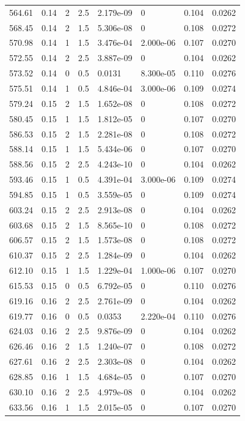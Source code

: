 \documentclass[preview]{standalone}
\begin{document}
{{{{\begin{tabular}{L{1.2cm}C{1.2cm} C{0.3cm}C{0.5cm} C{1.4cm}C{1.4cm} C{1.4cm}C{1.4cm}}
  564.61  &  0.14  & 2     & 2.5 &  2.179e-09  & 0  & 0.104 &  0.0262   \\ 
  568.45  &  0.14  & 2     & 1.5 &  5.306e-08  & 0  & 0.108 &  0.0272   \\ 
  570.98  &  0.14  & 1     & 1.5 &  3.476e-04  & 2.000e-06  & 0.107 &  0.0270   \\ 
  572.55  &  0.14  & 2     & 2.5 &  3.887e-09  & 0  & 0.104 &  0.0262   \\ 
  573.52  &  0.14  & 0     & 0.5 &  0.0131  & 8.300e-05  & 0.110 &  0.0276   \\ 
  575.51  &  0.14  & 1     & 0.5 &  4.846e-04  & 3.000e-06  & 0.109 &  0.0274   \\ 
  579.24  &  0.15  & 2     & 1.5 &  1.652e-08  & 0  & 0.108 &  0.0272   \\ 
  580.45  &  0.15  & 1     & 1.5 &  1.812e-05  & 0  & 0.107 &  0.0270   \\ 
  586.53  &  0.15  & 2     & 1.5 &  2.281e-08  & 0  & 0.108 &  0.0272   \\ 
  588.14  &  0.15  & 1     & 1.5 &  5.434e-06  & 0  & 0.107 &  0.0270   \\ 
  588.56  &  0.15  & 2     & 2.5 &  4.243e-10  & 0  & 0.104 &  0.0262   \\ 
  593.46  &  0.15  & 1     & 0.5 &  4.391e-04  & 3.000e-06  & 0.109 &  0.0274   \\ 
  594.85  &  0.15  & 1     & 0.5 &  3.559e-05  & 0  & 0.109 &  0.0274   \\ 
  603.24  &  0.15  & 2     & 2.5 &  2.913e-08  & 0  & 0.104 &  0.0262   \\ 
  603.68  &  0.15  & 2     & 1.5 &  8.565e-10  & 0  & 0.108 &  0.0272   \\ 
  606.57  &  0.15  & 2     & 1.5 &  1.573e-08  & 0  & 0.108 &  0.0272   \\ 
  610.37  &  0.15  & 2     & 2.5 &  1.284e-09  & 0  & 0.104 &  0.0262   \\ 
  612.10  &  0.15  & 1     & 1.5 &  1.229e-04  & 1.000e-06  & 0.107 &  0.0270   \\ 
  615.53  &  0.15  & 0     & 0.5 &  6.792e-05  & 0  & 0.110 &  0.0276   \\ 
  619.16  &  0.16  & 2     & 2.5 &  2.761e-09  & 0  & 0.104 &  0.0262   \\ 
  619.77  &  0.16  & 0     & 0.5 &  0.0353  & 2.220e-04  & 0.110 &  0.0276   \\ 
  624.03  &  0.16  & 2     & 2.5 &  9.876e-09  & 0  & 0.104 &  0.0262   \\ 
  626.46  &  0.16  & 2     & 1.5 &  1.240e-07  & 0  & 0.108 &  0.0272   \\ 
  627.61  &  0.16  & 2     & 2.5 &  2.303e-08  & 0  & 0.104 &  0.0262   \\ 
  628.85  &  0.16  & 1     & 1.5 &  4.684e-05  & 0  & 0.107 &  0.0270   \\ 
  630.10  &  0.16  & 2     & 2.5 &  4.979e-08  & 0  & 0.104 &  0.0262   \\ 
  633.56  &  0.16  & 1     & 1.5 &  2.015e-05  & 0  & 0.107 &  0.0270   \\ 
\hline 
\end{tabular} 

}}}}
\end{document}
